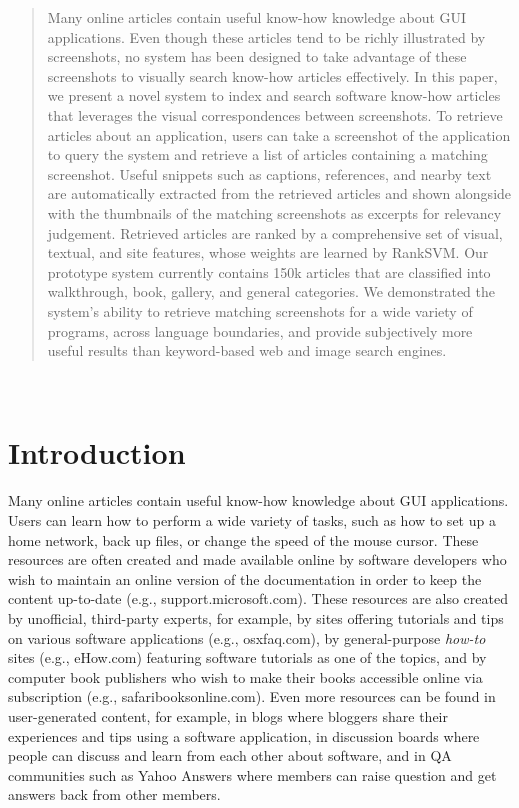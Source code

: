\documentclass{www2010-submission}
\begin{document}
\begin{abstract}
  Many online articles contain useful know-how knowledge about GUI
  applications. Even though these articles tend to be richly
  illustrated by screenshots, no system has been designed to take
  advantage of these screenshots to visually search know-how articles
  effectively.  In this paper, we present a novel system to index and
  search software know-how articles that leverages the visual
  correspondences between screenshots. To retrieve articles about an
  application, users can take a screenshot of the application to query
  the system and retrieve a list of articles containing a matching
  screenshot.  Useful snippets such as captions, references, and
  nearby text are automatically extracted from the retrieved articles
  and shown alongside with the thumbnails of the matching screenshots
  as excerpts for relevancy judgement. Retrieved articles are ranked
  by a comprehensive set of visual, textual, and site features, whose
  weights are learned by RankSVM. Our prototype system currently
  contains 150k articles that are classified into walkthrough, book,
  gallery, and general categories. We demonstrated the system's
  ability to retrieve matching screenshots for a wide variety of
  programs, across language boundaries, and provide subjectively more
  useful results than keyword-based web and image search engines.
\end{abstract}

\\



\section{Introduction}

Many online articles contain useful know-how knowledge about GUI
applications. Users can learn how to perform a
wide variety of tasks, such as how to set up a home network, back up
files, or change the speed of the mouse cursor. These resources are
often created and made available online by software developers who
wish to maintain an online version of the documentation in order to keep the content up-to-date (e.g.,
support.microsoft.com). These resources are also created by
unofficial, third-party experts, for example, by sites offering
tutorials and tips on various software applications (e.g.,
osxfaq.com), by general-purpose \emph{how-to} sites (e.g., eHow.com)
featuring software tutorials as one of the topics, and by computer
book publishers who wish to make their books accessible online via
subscription (e.g., safaribooksonline.com). Even more resources can be
found in user-generated content, for example, in blogs where bloggers
share their experiences and tips using a software application, in
discussion boards where people can discuss and learn from each other
about software, and in QA communities such as Yahoo Answers where
members can raise question and get answers back from other members.
\end{document}
